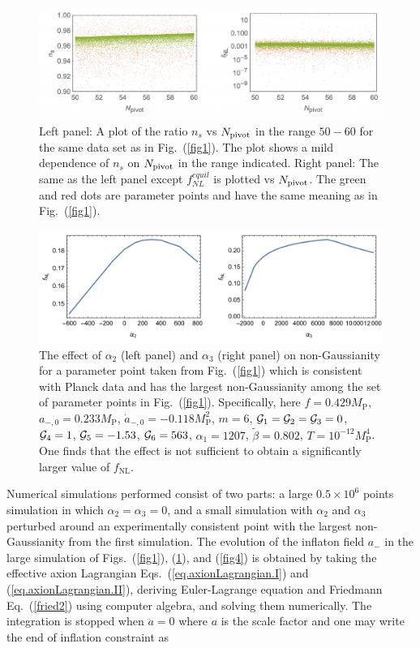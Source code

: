 \documentclass[a4paper,11pt]{article}
\begin{document}
  \begin{figure}
    \centering
    \includegraphics[width=1.0\textwidth]{figs/fig2.pdf}
    \caption{Left panel: A plot of the ratio $n_s$ vs $N_{\rm pivot}$ in the range $50-60$ for the same data set as in Fig.~(\ref{fig1}).
    The plot shows a mild dependence of $n_s$ on $N_{\rm pivot}$ in the range indicated. Right panel: The same as the left panel except
    $f^{equil}_{NL}$ is plotted vs $N_{\rm pivot}$.
    The green and red dots are parameter points and have the same meaning as in Fig.~(\ref{fig1}).}
    \label{fig2}
  \end{figure}

  \begin{figure}
  	\centering
  	\includegraphics[width=1.0\textwidth]{figs/fig3.pdf}
  	\caption{The effect of $\alpha_2$ (left panel) and $\alpha_3$ (right panel) on non-Gaussianity for a parameter point 
	taken from Fig.~(\ref{fig1}) which is consistent with 
	Planck data and has the  largest non-Gaussianity among the set of parameter points 
  in Fig.~(\ref{fig1}). Specifically, here $f = 0.429 M_\text{P}$, $a_{-, 0} = 0.233 M_\text{P}$, $\dot a_{-, 0} = -0.118 M_\text{P}^2$, $m = 6$, ${\cal{G}}_1 = {\cal{G}}_2 = {\cal{G}}_3 = 0$, ${\cal{G}}_4 = 1$, ${\cal{G}}_5 = -1.53$, ${\cal{G}}_6 = 563$, $\alpha_1 = 1207$, $\tilde \beta = 0.802$, $T = 10^{-12} M_\text{P}^4$. One
	finds that
	 the effect is not sufficient to obtain a significantly larger value of $f_\text{NL}$.}
  	\label{fig3}
  \end{figure}

Numerical simulations performed consist of two parts: a large $0.5 \times 10^6$ points simulation in which $\alpha_2 = \alpha_3 = 0$, and a small simulation with $\alpha_2$ and $\alpha_3$ perturbed around an experimentally consistent point with the largest non-Gaussianity from the first simulation.
  The evolution of the inflaton field $a_-$ in the large simulation of Figs.~(\ref{fig1}), (\ref{fig2}), and (\ref{fig4}) is obtained by taking the effective axion Lagrangian Eqs.~(\ref{eq.axionLagrangian.I}) and (\ref{eq.axionLagrangian.II}), deriving Euler-Lagrange equation and Friedmann Eq.~(\ref{fried2}) using computer algebra, and solving them numerically. The integration is stopped when $\ddot{a} = 0$ where $a$ is the scale factor
  and one may write the end of inflation constraint as 
\end{document}
